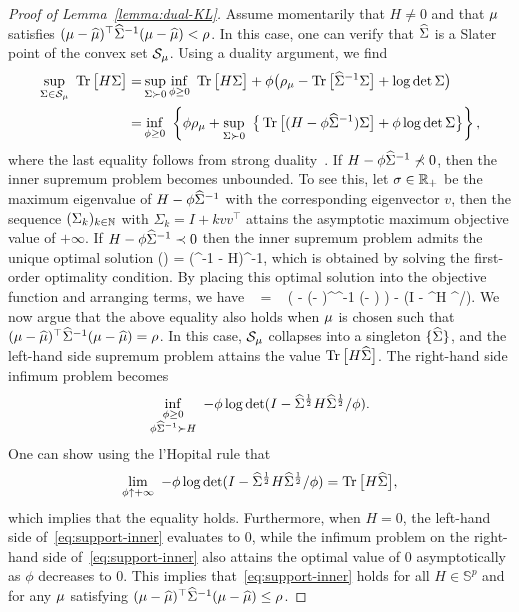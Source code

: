 \documentclass{article}
\begin{document}
\begin{proof}[Proof of Lemma~\ref{lemma:dual-KL}]
	Assume momentarily that $H \neq 0$ and that $\mu$ satisfies $(\mu - \widehat {\mu})^\top \widehat{\Sigma}^{-1} (\mu - \widehat {\mu}) < \rho$. In this case, one can verify that $\widehat{\Sigma}$ is a Slater point of the convex set $\mathcal S_\mu$. Using a duality argument, we find
	\begin{align*}
	\sup\limits_{\Sigma \in \mathcal S_\mu} ~ \operatorname{Tr} \big[ H \Sigma \big] =& \sup\limits_{\Sigma \succ 0} \inf\limits_{\phi \ge 0} ~\operatorname{Tr} \big[ H \Sigma \big] + \phi \big(\rho_\mu - \operatorname{Tr} \big[ \widehat{\Sigma}^{-1} \Sigma \big] + \log\det \Sigma \big) \notag\\
	=& \inf\limits_{\phi \ge 0} ~\left\{ \phi \rho_\mu + \sup\limits_{\Sigma \succ 0}~ \big\{ \operatorname{Tr} \big[ (H - \phi \widehat{\Sigma}^{-1})\Sigma \big]  + \phi \log \det \Sigma \big\} \right\},  \notag
	\end{align*}
	where the last equality follows from strong duality~\citep[Proposition~5.3.1]{ref:bertsekas2009convex}. %
	If $H - \phi \widehat{\Sigma}^{-1} \not\prec 0$, then the inner supremum problem becomes unbounded. To see this, let $\sigma \in \mathbb{R}_+$ be the maximum eigenvalue of $H - \phi \widehat{\Sigma}^{-1}$ with the corresponding eigenvector $v$, then the sequence $(\Sigma_k)_{k\in \mathbb N}$ with $\Sigma_k = I + k vv^\top$ attains the asymptotic maximum objective value of $+\infty$. If $H - \phi \widehat{\Sigma}^{-1} \prec 0$  then the inner supremum problem admits the unique optimal solution
	\be \label{eq:unique-cov}
	\cov\opt(\phi) = \phi (\phi \covsa^{-1} - H)^{-1},
	\ee
	which is obtained by solving the first-order optimality condition. By placing this optimal solution into the objective function and arranging terms, we have
	\be \label{eq:support-inner}
	 ~  = ~ \phi \big( \rho - (\m - \msa)^\top \covsa^{-1} (\m - \msa) \big) - \phi \log \det (I - \covsa^\half H \covsa^\half /\phi).
	\ee
	We now argue that the above equality also holds when $\mu$ is chosen such that $(\mu - \widehat {\mu})^\top \widehat{\Sigma}^{-1} (\mu - \widehat {\mu}) = \rho$. In this case, $\mathcal S_\mu$ collapses into a singleton $\{\widehat{\Sigma}\}$, and the left-hand side supremum problem attains the value $\operatorname{Tr} \big[ H\widehat{\Sigma} \big]$. The right-hand side infimum problem becomes
	\[
	    \inf\limits_{\substack{\phi \ge 0 \\ \phi \widehat{\Sigma}^{-1} \succ H }}~ - \phi \log \det (I - \widehat{\Sigma}^{\frac{1}{2}} H \widehat{\Sigma}^{\frac{1}{2}} /\phi).
	\]
	One can show using the l'Hopital rule that
	\[
	    \lim_{\phi \uparrow +\infty}~- \phi \log \det (I - \widehat{\Sigma}^{\frac{1}{2}} H \widehat{\Sigma}^{\frac{1}{2}} /\phi) = \operatorname{Tr} \big[ H\widehat{\Sigma} \big],
	\]
	which implies that the equality holds. Furthermore, when $H = 0$, the left-hand side of~\eqref{eq:support-inner} evaluates to 0, while the infimum problem on the right-hand side of~\eqref{eq:support-inner} also attains the optimal value of 0 asymptotically as $\phi$ decreases to 0. This implies that~\eqref{eq:support-inner} holds for all $H \in \mathbb{S}^p$ and for any $\mu$ satisfying $(\mu - \widehat {\mu})^\top \widehat{\Sigma}^{-1} (\mu - \widehat {\mu}) \le \rho$. %
	

\end{proof}
\end{document}
